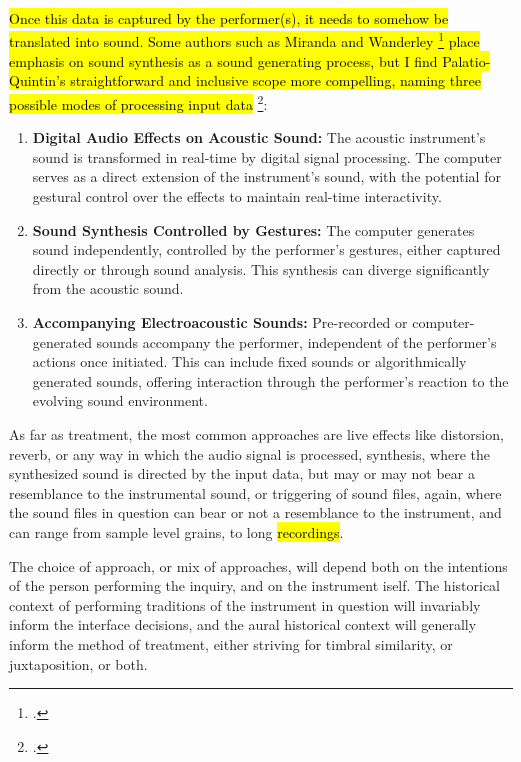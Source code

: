 \documentclass[12pt,twoside,maitrise]{dms_ks}
\theoremstyle{definition}
\begin{document}

\hl{Once this data is captured by the performer(s), it needs to somehow be translated into sound. Some authors such as Miranda and Wanderley \footcite[3]{miranda_new_2006} place emphasis on sound synthesis as a sound generating process, but I find Palatio-Quintin's straightforward and inclusive scope more compelling, naming three possible modes of processing input data} \footcite[52]{palacio-quintin_composition_2012-1}:

{\begin{enumerate}
  \item \textbf{Digital Audio Effects on Acoustic Sound:} The acoustic instrument's sound is transformed in real-time by digital signal processing. 
The computer serves as a direct extension of the instrument's sound, with the potential for gestural control over the effects to maintain real-time interactivity.
  
  \item \textbf{Sound Synthesis Controlled by Gestures:} The computer generates sound independently, controlled by the performer's gestures, either captured directly or through sound analysis. 
This synthesis can diverge significantly from the acoustic sound.
  
  \item \textbf{Accompanying Electroacoustic Sounds:} Pre-recorded or computer-generated sounds accompany the performer, independent of the performer's actions once initiated. 
This can include fixed sounds or algorithmically generated sounds, offering interaction through the performer's reaction to the evolving sound environment.
\end{enumerate}


As far as treatment, the most common approaches are live effects like distorsion, reverb, or any way in which the audio signal is processed, synthesis, where the synthesized sound is directed by the input data, but may or may not bear a resemblance to the instrumental sound, or triggering of sound files, again, where the sound files in question can bear or not a resemblance to the instrument, and can range from sample level grains, to long \hl{recordings}.


The choice of approach, or mix of approaches, will depend both on the intentions of the person performing the inquiry, and on the instrument iself. The historical context of performing traditions of the instrument in question will invariably inform the interface decisions, and the aural historical context will generally inform the method of treatment, either striving for timbral similarity, or juxtaposition, or both.

}
\end{document}
